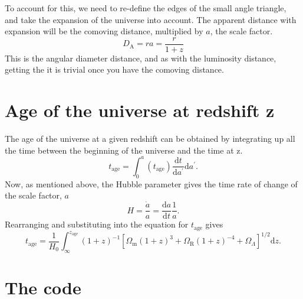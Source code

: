 \documentclass[]{article}
\begin{document}
\noindent To account for this, we need to re-define the edges of the small angle triangle, and take the expansion of the universe into account. The apparent distance with expansion will be the comoving distance, multiplied by $a$, the scale factor. 
\begin{equation}
D_\mathrm{A} = r a = \frac{r}{1+z}
\end{equation}
This is the angular diameter distance, and as with the luminosity distance, getting the it is trivial once you have the comoving distance. 

\section{Age of the universe at redshift z}

The age of the universe at a given redshift can be obtained by integrating up all the time between the beginning of the universe and the time at z. 
\begin{equation}
t_\mathrm{age} = \int_0^a(t_\mathrm{age}) \frac{\mathrm{d}t}{\mathrm{d}a^\prime} \mathrm{d}a^\prime.
\end{equation}
Now, as mentioned above, the Hubble parameter gives the time rate of change of the scale factor, $a$
\begin{equation}
H = \frac{\dot a}{a} = \frac{\mathrm{d}a}{\mathrm{d}t}\frac{1}{a}.
\end{equation}
Rearranging and substituting into the equation for $t_\mathrm{age}$ gives 
\begin{equation}
t_\mathrm{age} = \frac{1}{H_0}\int_\infty^{z_\mathrm{age}} (1+z)^{-1} [\Omega_\mathrm{m} (1+z)^{3}+\Omega_\mathrm{R} (1+z)^{-4}+\Omega_\Lambda]^{1/2} \mathrm{d}z.
\label{eq:tage}
\end{equation}

\section{The code}
\end{document}
